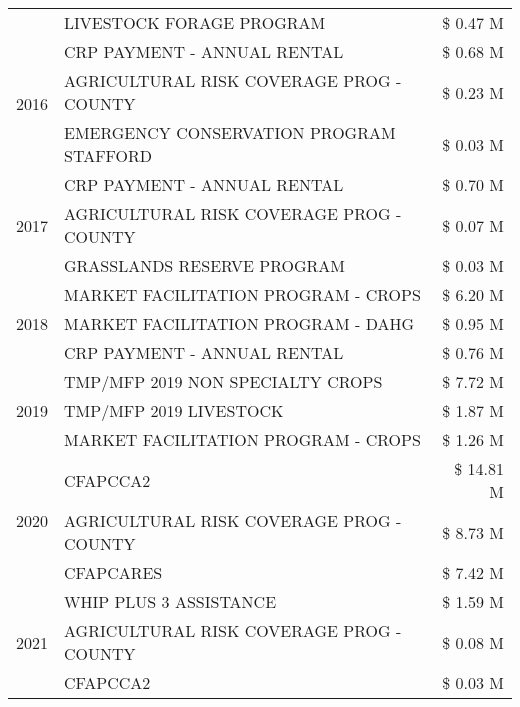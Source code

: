 \begin{tabular}{llr}
 & LIVESTOCK FORAGE PROGRAM & \$ 0.47 M \\
\cline{1-3}
\multirow[t]{3}{*}{2016} & CRP PAYMENT - ANNUAL RENTAL & \$ 0.68 M \\
 & AGRICULTURAL RISK COVERAGE PROG - COUNTY & \$ 0.23 M \\
 & EMERGENCY CONSERVATION PROGRAM STAFFORD & \$ 0.03 M \\
\cline{1-3}
\multirow[t]{3}{*}{2017} & CRP PAYMENT - ANNUAL RENTAL & \$ 0.70 M \\
 & AGRICULTURAL RISK COVERAGE PROG - COUNTY & \$ 0.07 M \\
 & GRASSLANDS RESERVE PROGRAM & \$ 0.03 M \\
\cline{1-3}
\multirow[t]{3}{*}{2018} & MARKET FACILITATION PROGRAM - CROPS & \$ 6.20 M \\
 & MARKET FACILITATION PROGRAM - DAHG & \$ 0.95 M \\
 & CRP PAYMENT - ANNUAL RENTAL & \$ 0.76 M \\
\cline{1-3}
\multirow[t]{3}{*}{2019} & TMP/MFP 2019 NON SPECIALTY CROPS & \$ 7.72 M \\
 & TMP/MFP 2019 LIVESTOCK & \$ 1.87 M \\
 & MARKET FACILITATION PROGRAM - CROPS & \$ 1.26 M \\
\cline{1-3}
\multirow[t]{3}{*}{2020} & CFAPCCA2 & \$ 14.81 M \\
 & AGRICULTURAL RISK COVERAGE PROG - COUNTY & \$ 8.73 M \\
 & CFAPCARES & \$ 7.42 M \\
\cline{1-3}
\multirow[t]{3}{*}{2021} & WHIP PLUS 3 ASSISTANCE & \$ 1.59 M \\
 & AGRICULTURAL RISK COVERAGE PROG - COUNTY & \$ 0.08 M \\
 & CFAPCCA2 & \$ 0.03 M \\
\cline{1-3}
\bottomrule
\end{tabular}
